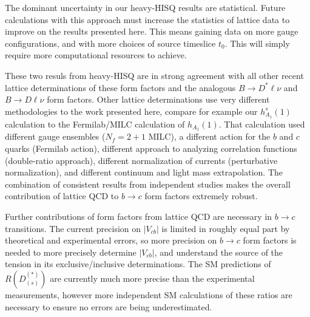 The dominant uncertainty in our heavy-HISQ results are statistical. Future calculations with this approach must increase the statistics of lattice data to improve on the results presented here. This means gaining data on more gauge configurations, and with more choices of source timeslice $t_0$. This will simply require more computational resources to achieve.

These two resuls from heavy-HISQ are in strong agreement with all other recent lattice determinations of these form factors and the analogous $B\to D^*\ell \nu$ and $B\to D\ell\nu$ form factors. Other lattice determinations use very different methodologies to the work presented here, compare for example our $h_{A_1}^s(1)$ calculation to the Fermilab/MILC calculation of $h_{A_1}(1)$. That calculation used different gauge ensembles ($N_f=2+1$ MILC), a different action for the $b$ and $c$ quarks (Fermilab action), different approach to analyzing correlation functions (double-ratio approach), different normalization of currents (perturbative normalization), and different continuum and light mass extrapolation. The combination of consistent results from independent studies makes the overall contribution of lattice QCD to $b\to c$ form factors extremely robust.

Further contributions of form factors from lattice QCD are necessary in $b\to c$ transitions. The current precision on $|V_{cb}|$ is limited in roughly equal part by theoretical and experimental errors, so more precision on $b\to c$ form factors is needed to more precisely determine $|V_{cb}|$, and understand the source of the tension in its exclusive/inclusive determinations. The SM predictions of $R(D_{(s)}^{(*)})$ are currently much more precise than the experimental measurements, however more independent SM calculations of these ratios are necessary to ensure no errors are being underestimated.


